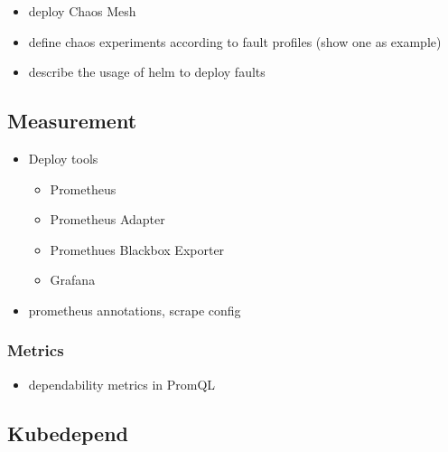 \begin{itemize}
	\item deploy Chaos Mesh
	\item define chaos experiments according to fault profiles (show one as example)
	\item describe the usage of helm to deploy faults
\end{itemize}

\subsection{Measurement} \label{measurement-impl}

\begin{itemize}
	\item Deploy tools \begin{itemize}
		\item Prometheus
		\item Prometheus Adapter
		\item Promethues Blackbox Exporter
		\item Grafana
	\end{itemize}
	\item prometheus annotations, scrape config
\end{itemize}

\subsubsection{Metrics}

\begin{itemize}
	
	\item dependability metrics in PromQL
\end{itemize}







\subsection{Kubedepend}

